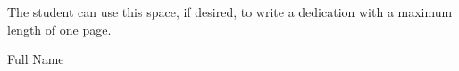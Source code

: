 \begin{center}
	
	The student can use this space, if desired, to write a dedication with a maximum length of one page.
\end{center}
\vspace{8cm}
\begin{flushright}
    Full Name
\end{flushright}